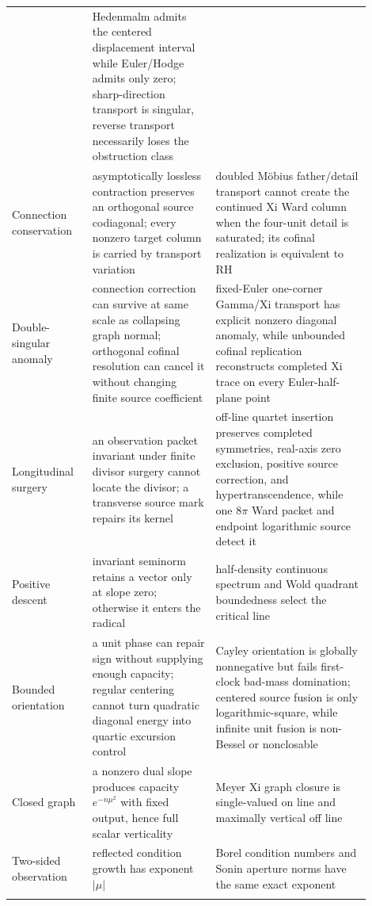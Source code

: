 \documentclass[11pt]{article}
\theoremstyle{definition}
\theoremstyle{remark}
\begin{document}
\begin{longtable}{@{}>{\raggedright\arraybackslash}p{0.20\linewidth}
                >{\raggedright\arraybackslash}p{0.31\linewidth}
                >{\raggedright\arraybackslash}p{0.39\linewidth}@{}}
 & Hedenmalm admits the centered displacement interval while Euler/Hodge admits only zero; sharp-direction transport is singular, reverse transport necessarily loses the obstruction class\\\addlinespace[2pt]
Connection conservation
 & asymptotically lossless contraction preserves an orthogonal source codiagonal; every nonzero target column is carried by transport variation
 & doubled M\"obius father/detail transport cannot create the continued Xi Ward column when the four-unit detail is saturated; its cofinal realization is equivalent to RH\\\addlinespace[2pt]
Double-singular anomaly
 & connection correction can survive at same scale as collapsing graph normal; orthogonal cofinal resolution can cancel it without changing finite source coefficient
 & fixed-Euler one-corner Gamma/Xi transport has explicit nonzero diagonal anomaly, while unbounded cofinal replication reconstructs completed Xi trace on every Euler-half-plane point\\\addlinespace[2pt]
Longitudinal surgery
 & an observation packet invariant under finite divisor surgery cannot locate the divisor; a transverse source mark repairs its kernel
 & off-line quartet insertion preserves completed symmetries, real-axis zero exclusion, positive source correction, and hypertranscendence, while one \(8\pi\) Ward packet and endpoint logarithmic source detect it\\\addlinespace[2pt]
Positive descent
 & invariant seminorm retains a vector only at slope zero; otherwise it enters the radical
 & half-density continuous spectrum and Wold quadrant boundedness select the critical line\\\addlinespace[2pt]
Bounded orientation
 & a unit phase can repair sign without supplying enough capacity; regular centering cannot turn quadratic diagonal energy into quartic excursion control
 & Cayley orientation is globally nonnegative but fails first-clock bad-mass domination; centered source fusion is only logarithmic-square, while infinite unit fusion is non-Bessel or nonclosable\\\addlinespace[2pt]
Closed graph
 & a nonzero dual slope produces capacity \(e^{-n\mu^2}\) with fixed output, hence full scalar verticality
 & Meyer Xi graph closure is single-valued on line and maximally vertical off line\\\addlinespace[2pt]
Two-sided observation
 & reflected condition growth has exponent \(|\mu|\)
 & Borel condition numbers and Sonin aperture norms have the same exact exponent\\\addlinespace[2pt]

\end{longtable}
\end{document}
